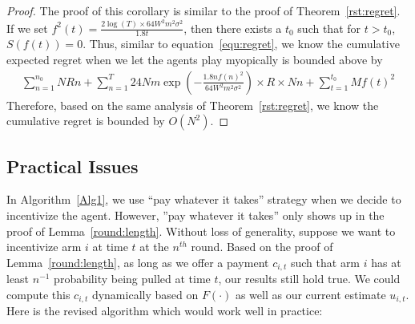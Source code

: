                               \begin{proof}
                              The proof of this corollary is similar to the proof of Theorem~\ref{rst:regret}. If we set $f^2(t)=\frac{2\log(T)\times 64W^2 m^2\sigma^2}{1.8t}$, then there exists a $t_{0}$ such that for $t>t_{0}$, $S(f(t))=0$. Thus, similar to equation~\eqref{equ:regret}, we know the cumulative expected regret when we let the agents play myopically is bounded above by
                              \begin{align}
                              \sum_{n=1}^{n_{0}}NRn + \sum_{n=1}^{T} 24Nm\exp\left(-\frac{1.8n f(n)^2}{64 W^2 m^2\sigma^2}\right)\times R \times Nn+ \sum_{t=1}^{t_{0}}Mf(t)^2 \nonumber
                              \end{align}
                              Therefore, based on the same analysis of Theorem~\ref{rst:regret}, we know the cumulative regret is bounded by $O(N^2)$.
                              \end{proof}


                              \subsection{Practical Issues}
                              \label{sec:pi}

                              In Algorithm~\ref{Alg1}, we use ``pay whatever it takes'' strategy when we decide to incentivize the agent. However, ''pay whatever it takes'' only shows up in the proof of Lemma~\ref{round:length}. Without loss of generality, suppose we want to incentivize arm $i$ at time $t$ at the $n^{th}$ round. Based on the proof of Lemma~\ref{round:length}, as long as we offer a payment $c_{i,t}$ such that arm $i$ has at least $n^{-1}$ probability being pulled at time $t$, our results still hold true. We could compute this $c_{i,t}$ dynamically based on $F(\cdot)$ as well as our current estimate $u_{i,t}$. Here is the revised algorithm which would work well in practice:


